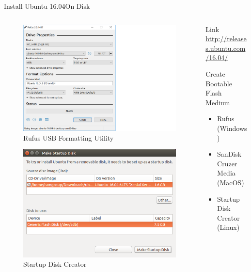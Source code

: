 \documentclass{beamer}
\begin{document}
\begin{frame}{Install Ubuntu 16.04}{On Disk}
	\begin{columns}[T]
		\begin{column}{0.5\textwidth}
			\begin{figure}
				\includegraphics[scale=0.17]{figs/rufus_en_2x.png}
				\caption{Rufus USB Formatting Utility}
			\end{figure}
			\begin{figure}
				\includegraphics[scale=0.15]{figs/startupDiskCreator.png}
				\caption{Startup Disk Creator}
			\end{figure}
		\end{column}
		\begin{column}{0.5\textwidth}
			\begin{block}{Link}
				\url{http://releases.ubuntu.com/16.04/}
			\end{block}
			\begin{block}{Create Bootable Flash Medium}
			\begin{itemize}
				\item Rufus (Windows)
				\item SanDisk Cruzer Media (MacOS)
				\item Startup Disk Creator (Linux)
			\end{itemize}
			\end{block}
		\end{column}
	\end{columns}	  
\end{frame}
\end{document}
